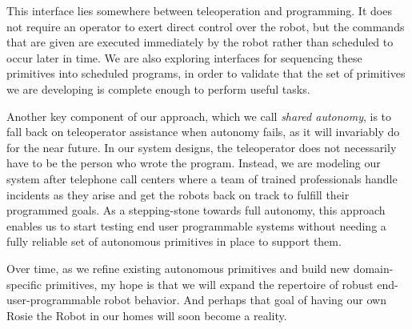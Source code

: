 \documentclass[10pt,twocolumn]{article}
\begin{document}
This interface lies somewhere between teleoperation and programming. It does not require an operator to exert direct control over the robot, but the commands that are given are executed immediately by the robot rather than scheduled to occur later in time. We are also exploring interfaces for sequencing these primitives into scheduled programs, in order to validate that the set of primitives we are developing is complete enough to perform useful tasks.

Another key component of our approach, which we call {\em shared autonomy}, is to fall back on teleoperator assistance when autonomy fails, as it will invariably do for the near future. In our system designs, the teleoperator does not necessarily have to be the person who wrote the program. Instead, we are modeling our system after telephone call centers where a team of trained professionals handle incidents as they arise and get the robots back on track to fulfill their programmed goals. As a stepping-stone towards full autonomy, this approach enables us to start testing end user programmable systems without needing a fully reliable set of autonomous primitives in place to support them.

Over time, as we refine existing autonomous primitives and build new domain-specific primitives, my hope is that we will expand the repertoire of robust end-user-programmable robot behavior. And perhaps that goal of having our own Rosie the Robot in our homes will soon become a reality.

\end{document}
